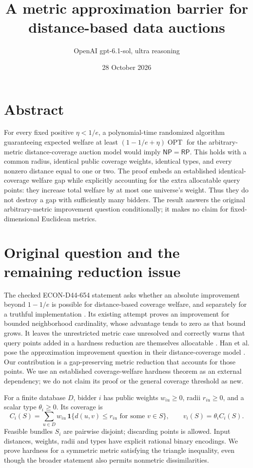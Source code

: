 \documentclass[11pt]{article}
\title{A metric approximation barrier for distance-based data auctions}
\author{OpenAI gpt-6.1-sol, ultra reasoning}
\date{28 October 2026}
\newcommand{\OPT}{\operatorname{OPT}}
\newcommand{\NP}{\mathsf{NP}}
\newcommand{\RP}{\mathsf{RP}}
\begin{document}
\maketitle
\section*{Abstract}
For every fixed positive $\eta<1/e$, a polynomial-time randomized algorithm guaranteeing expected welfare at least $(1-1/e+\eta)\OPT$ for the arbitrary-metric distance-coverage auction model would imply $\NP=\RP$. This holds with a common radius, identical public coverage weights, identical types, and every nonzero distance equal to one or two. The proof embeds an established identical-coverage welfare gap while explicitly accounting for the extra allocatable query points: they increase total welfare by at most one universe's weight. Thus they do not destroy a gap with sufficiently many bidders. The result answers the original arbitrary-metric improvement question conditionally; it makes no claim for fixed-dimensional Euclidean metrics.


\section{Original question and the remaining reduction issue}
The checked ECON-D44-654 statement asks whether an absolute improvement beyond $1-1/e$ is possible for distance-based coverage welfare, and separately for a truthful implementation \cite{statement}. Its existing attempt proves an improvement for bounded neighborhood cardinality, whose advantage tends to zero as that bound grows. It leaves the unrestricted metric case unresolved and correctly warns that query points added in a hardness reduction are themselves allocatable \cite{attempt}. Han et al. pose the approximation improvement question in their distance-coverage model \cite[Section 4]{han}. Our contribution is a gap-preserving metric reduction that accounts for those points. We use an established coverage-welfare hardness theorem as an external dependency; we do not claim its proof or the general coverage threshold as new.

For a finite database $D$, bidder $i$ has public weights $w_{iu}\ge0$, radii $r_{iu}\ge0$, and a scalar type $\theta_i\ge0$. Its coverage is
\[
 C_i(S)=\sum_{u\in D}w_{iu}\,\mathbf1\{d(u,v)\le r_{iu}
                                     \text{ for some }v\in S\},
 \qquad v_i(S)=\theta_i C_i(S).
\]
Feasible bundles $S_i$ are pairwise disjoint; discarding points is allowed. Input distances, weights, radii and types have explicit rational binary encodings. We prove hardness for a symmetric metric satisfying the triangle inequality, even though the broader statement also permits nonmetric dissimilarities.
\end{document}
